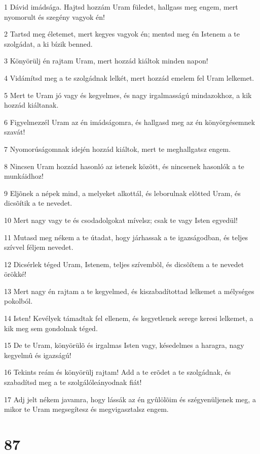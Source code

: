 \par 1 Dávid imádsága. Hajtsd hozzám Uram füledet, hallgass meg engem, mert nyomorult és szegény vagyok én!
\par 2 Tartsd meg életemet, mert kegyes vagyok én; mentsd meg én Istenem a te szolgádat, a ki bízik benned.
\par 3 Könyörülj én rajtam Uram, mert hozzád kiáltok minden napon!
\par 4 Vidámítsd meg a te szolgádnak lelkét, mert hozzád emelem fel Uram lelkemet.
\par 5 Mert te Uram jó vagy és kegyelmes, és nagy irgalmasságú mindazokhoz, a kik hozzád kiáltanak.
\par 6 Figyelmezzél Uram az én imádságomra, és hallgasd meg az én könyörgésemnek szavát!
\par 7 Nyomorúságomnak idején hozzád kiáltok, mert te meghallgatsz engem.
\par 8 Nincsen Uram hozzád hasonló az istenek között, és nincsenek hasonlók a te munkáidhoz!
\par 9 Eljõnek a népek mind, a melyeket alkottál, és leborulnak elõtted Uram, és dicsõítik a te nevedet.
\par 10 Mert nagy vagy te és csodadolgokat mívelsz; csak te vagy Isten egyedül!
\par 11 Mutasd meg nékem a te útadat, hogy járhassak a te igazságodban, és teljes szívvel féljem nevedet.
\par 12 Dicsérlek téged Uram, Istenem, teljes szívembõl, és dicsõítem a te nevedet örökké!
\par 13 Mert nagy én rajtam a te kegyelmed, és kiszabadítottad lelkemet a mélységes pokolból.
\par 14 Isten! Kevélyek támadtak fel ellenem, és kegyetlenek serege keresi lelkemet, a kik meg sem gondolnak téged.
\par 15 De te Uram, könyörülõ és irgalmas Isten vagy, késedelmes a haragra, nagy kegyelmû és igazságú!
\par 16 Tekints reám és könyörülj rajtam! Add a te erõdet a te szolgádnak, és szabadítsd meg a te szolgálóleányodnak fiát!
\par 17 Adj jelt nékem javamra, hogy lássák az én gyûlölõim és szégyenüljenek meg, a mikor te Uram megsegítesz és megvigasztalsz engem.

\chapter{87}

